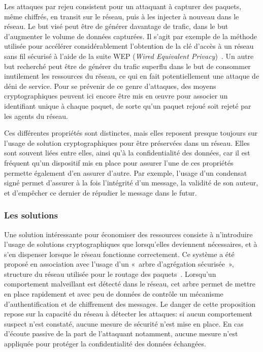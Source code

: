 Les attaques par rejeu consistent pour un attaquant à capturer des paquets, même chiffrés, en transit sur le réseau, puis à les injecter à nouveau dans le réseau.
Le but visé peut être de générer davantage de trafic, dans le but d'augmenter le volume de données capturées.
Il s'agit par exemple de la méthode utilisée pour accélérer considérablement l'obtention de la clé d'accès à un réseau sans fil sécurisé à l'aide de la suite WEP (\textit{Wired Equivalent Privacy})~\cite{BGW01}.
Un autre but recherché peut être de générer du trafic superflu dans le but de consommer inutilement les ressources du réseau, ce qui en fait potentiellement une attaque de déni de service.
Pour se prévenir de ce genre d'attaques, des moyens cryptographiques peuvent ici encore être mis en œuvre pour associer un identifiant unique à chaque paquet, de sorte qu'un paquet rejoué soit rejeté par les agents du réseau.

Ces différentes propriétés sont distinctes, mais elles reposent presque toujours sur l'usage de solution cryptographiques pour être préservées dans un réseau.
Elles sont souvent liées entre elles, ainsi qu'à la confidentialité des données, car il est fréquent qu'un dispositif mis en place pour assurer l'une de ces propriétés permette également d'en assurer d'autre.
Par exemple, l'usage d'un condensat signé permet d'assurer à la fois l'intégrité d'un message, la validité de son auteur, et d'empêcher ce dernier de répudier le message dans le futur.

    \subsubsection{Les solutions}
Une solution intéressante pour économiser des ressources consiste à n'introduire l'usage de solutions cryptographiques que lorsqu'elles deviennent nécessaires, et à s'en dispenser lorsque le réseau fonctionne correctement.
Ce système a été proposé en association avec l'usage d'un « arbre d'agrégation sécurisée », structure du réseau utilisée pour le routage des paquets~\cite{WDSX07}.
Lorsqu'un comportement malveillant est détecté dans le réseau, cet arbre permet de mettre en place rapidement et avec peu de données de contrôle un mécanisme d'authentification et de chiffrement des messages.
Le danger de cette proposition repose sur la capacité du réseau à détecter les attaques: si aucun comportement suspect n'est constaté, aucune mesure de sécurité n'est mise en place.
En cas d'écoute passive de la part de l'attaquant notamment, aucune mesure n'est appliquée pour protéger la confidentialité des données échangées.

